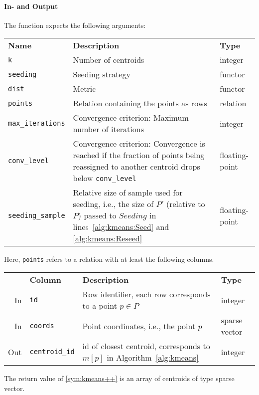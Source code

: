 \paragraph{In- and Output} The function expects the following arguments:

\begin{center}
	\begin{tabularx}{\linewidth}{lXl}
		\toprule%
		\textbf{Name} & \textbf{Description} & \textbf{Type}
		\\\otoprule
		\texttt{k} &
		Number of centroids &
		integer
		\\\midrule
		\texttt{seeding} &
		Seeding strategy &
		functor
		\\\midrule
		\texttt{dist} &
		Metric &
		functor
		\\\midrule
		\texttt{points} &
		Relation containing the points as rows &
		relation
		\\\midrule
		\texttt{max\_iterations} &
		Convergence criterion: Maximum number of iterations &
		integer
		\\\midrule
		\texttt{conv\_level} &
		Convergence criterion: Convergence is reached if the fraction of points being reassigned to another centroid drops below \texttt{conv\_level} &
		floating-point
		\\\midrule
		\texttt{seeding\_sample} &
		Relative size of sample used for seeding, i.e., the size of $P'$ (relative to $P$) passed to $\mathit{Seeding}$ in lines~\ref{alg:kmeans:Seed} and \ref{alg:kmeans:Reseed}  &
		floating-point
		\\\bottomrule
	\end{tabularx}
\end{center}
%
Here, \texttt{points} refers to a relation with at least the following columns.
%
\begin{center}
	\begin{tabularx}{\linewidth}{rlXl}
		\toprule%
		& \textbf{Column} & \textbf{Description} & \textbf{Type}
		\\\otoprule
		In &
		\texttt{id} &
		Row identifier, each row corresponds to a point $p \in P$ &
		integer
		\\\midrule
		In &
		\texttt{coords} &
		Point coordinates, i.e., the point $p$ &
		sparse vector
		\\\midrule
		Out &
		\texttt{centroid\_id} &
		id of closest centroid, corresponds to $m[p]$ in Algorithm~\ref{alg:kmeans} &
		integer
		\\\bottomrule
	\end{tabularx}
\end{center}
%
The return value of \ref{sym:kmeans++} is an array of centroids of type sparse vector.

